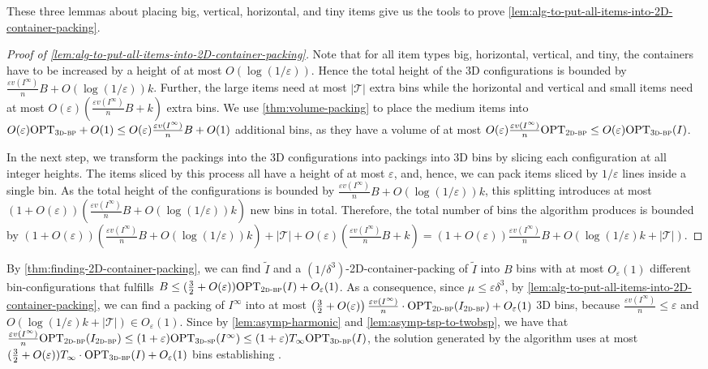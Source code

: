 \documentclass[a4paper,UKenglish,cleveref, autoref, thm-restate]{lipics-v2021}
\newcommand{\eps}{\varepsilon}
\newcommand{\opt}{\mathrm{OPT}}
\newcommand{\twobp}{\textsc{2d-bp}\xspace}
\newcommand{\tbp}{\textsc{3d-bp}\xspace}
\newcommand{\tsp}{\textsc{3d-sp}\xspace}
\newcommand{\bigy}{big\xspace}
\newcommand{\tin}{tiny\xspace}
\begin{document}
These three lemmas about placing \bigy, vertical, horizontal, and \tin items give us the tools to prove \cref{lem:alg-to-put-all-items-into-2D-container-packing}.

\begin{proof}[Proof of \cref{lem:alg-to-put-all-items-into-2D-container-packing}]
Note that for all item types \bigy, horizontal, vertical, and \tin, the containers have to be increased by a height of at most $O(\log(1/\eps))$.
Hence the total height of the 3D configurations is bounded by $\frac{\eps v(I^{\infty})}{n} B+O(\log(1/\eps))k$.
Further, the large items need at most $|\mathcal{T}|$ extra bins while the horizontal and vertical and small items need at most $O(\eps)(\frac{\eps v(I^{\infty})}{n} B+k)$ extra bins.
We use \cref{thm:volume-packing} to place the medium items into $O(\eps)\opt_{\tbp} +O(1) \leq O(\eps)\frac{\eps v(I^{\infty})}{n}B +O(1)$ additional bins, as they have a volume of at most $O(\eps)\frac{\eps v(I^{\infty})}{n}\opt_{\twobp} \leq O(\eps)\opt_{\tbp}(I)$.

In the next step, we transform the packings into the 3D configurations into packings into 3D bins by slicing each configuration at all integer heights. 
The items sliced by this process all have a height of at most $\eps$, and, hence, we can pack items sliced by $1/\eps$ lines inside a single bin. 
As the total height of the configurations is bounded by $\frac{\eps v(I^{\infty})}{n} B+O(\log(1/\eps))k$,
this splitting introduces at most $(1+O(\eps))(\frac{\eps v(I^{\infty})}{n} B+O(\log(1/\eps))k)$ new bins in total.
Therefore, the total number of bins the algorithm produces is bounded by 
$(1+O(\eps))(\frac{\eps v(I^{\infty})}{n} B+O(\log(1/\eps))k) + |\mathcal{T}| + O(\eps)(\frac{\eps v(I^{\infty})}{n} B+k) = (1+O(\eps))\frac{\eps v(I^{\infty})}{n} B + O(\log(1/\eps)k +|\mathcal{T}|)$.
\end{proof}


By \cref{thm:finding-2D-container-packing}, we can find $\tilde{I}$ and a $(1/\delta^3)$-2D-container-packing of $\tilde{I}$ into $B$ bins with at most $O_{\eps}(1)$ different bin-configurations that fulfills $B \leq (\frac{3}{2}+O(\eps))\opt_{\twobp}(I) +O_{\eps}(1)$.
As a consequence, since $\mu \leq \eps \delta^3$, by \cref{lem:alg-to-put-all-items-into-2D-container-packing}, we can find a packing of $I^\infty$ into at most 
$
\left(\frac{3}{2}+O(\eps)\right)\frac{\eps v(I^{\infty})}{n}\cdot \opt_{\twobp}(I_{\twobp}) + O_{\eps}(1)
$
3D bins, because $\frac{\eps v(I^{\infty})}{n} \leq \eps$ and $O(\log(1/\eps)k +|\mathcal{T}|) \in O_{\eps}(1)$.
Since by \cref{lem:asymp-harmonic} and \cref{lem:asymp-tsp-to-twobsp}, we have that 
$\frac{\eps v(I^{\infty})}{n}\opt_{\twobp}(I_{\twobp})  
\leq (1+\eps)\opt_{\tsp}(I^{\infty}) 
\leq (1+\eps)T_{\infty}\opt_{\tbp}(I)$,
the solution generated by the algorithm uses at most $(\frac{3}{2}+O(\eps))T_{\infty}\cdot \opt_{\tbp}(I) + O_{\eps}(1)$ bins
establishing .
\end{document}
